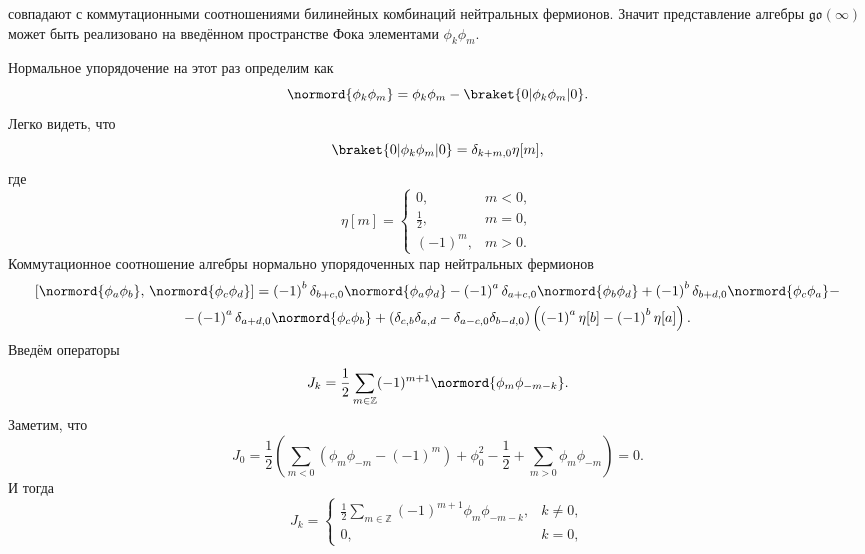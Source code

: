\documentclass[a5paper,twoside]{article}
\numberwithin{equation}{section}
\begin{document}
совпадают с коммутационными соотношениями билинейных
комбинаций нейтральных фермионов. Значит представление
алгебры $\mathfrak{go}(\infty)$ может быть реализовано
на введённом пространстве Фока элементами $\phi_k \phi_m$.

Нормальное упорядочение на этот раз определим как
\begin{equation}
\normord{\phi_k \phi_m}= \phi_k \phi_m - \braket{0 | \phi_k
\phi_m| 0}
.\end{equation} 
Легко видеть, что 
\begin{equation}
	\braket{0 | \phi_k \phi_m | 0}=\delta_{k+m,0} \eta[m]
,\end{equation}
где
\begin{equation}
	\eta[m]= \begin{cases}
		0,& m<0,\\
		\frac{1}{2},& m=0,\\
		(-1)^m,& m>0.
	\end{cases}
\end{equation} 
Коммутационное соотношение алгебры нормально упорядоченных пар нейтральных
фермионов 
\begin{multline}
	\left[ \normord{\phi_a \phi_b},\,\normord{\phi_c \phi_d} \right] =\left( -1 \right) ^b \delta_{b+c,0}
	\normord{\phi_a \phi_d}-\left( -1 \right) ^a
	\delta_{a+c,0}
	\normord{\phi_b \phi_d}+\left( -1 \right) ^b
	\delta_{b+d,0}\normord{\phi_c \phi_a}-\\-
	\left( -1 \right) ^a \delta_{a+d,0}
	\normord{\phi_c \phi_b}+
	\left(\delta_{c,b}\delta_{a,d}-\delta_{a-c,0}
	\delta_{b-d,0}\right) \left( 
\left( -1 \right) ^a \eta[b]-\left( -1 \right) ^b \eta[a]\right) 
.\end{multline} 
Введём операторы
\begin{equation}
	J_k= \frac{1}{2} \sum_{m \in \mathbb{Z}}^{} (-1)^{m+1} \normord{\phi_m \phi_{-m-k}}
.\end{equation} 
Заметим, что
\begin{equation}
J_0=\frac{1}{2}\left(\sum_{m<0}^{} \left( \phi_m \phi_{-m}-(-1)^m \right)+\phi_0^2-\frac{1}{2}+\sum_{m>0}^{} \phi_m \phi_{-m} \right)=0
.\end{equation} 
И тогда
\begin{equation}
J_k = \begin{cases}
	\displaystyle \frac{1}{2} \sum_{m \in \mathbb{Z}}^{} (-1)^{m+1}
	\phi_m \phi_{-m-k},& k\neq 0,\\
	0,& k=0,
\end{cases}
\end{equation} 
\end{document}
